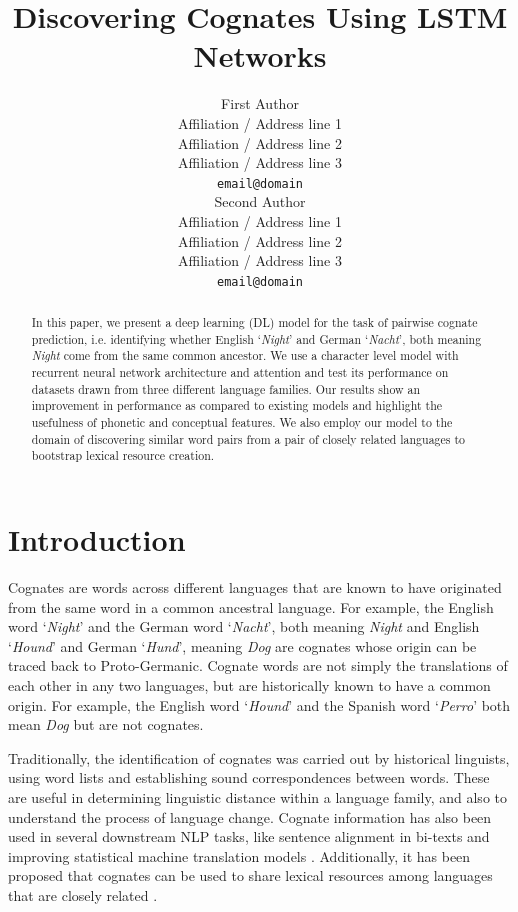 \documentclass[11pt,letterpaper]{article}
\title{Discovering Cognates Using LSTM Networks}
\author{First Author \\
  Affiliation / Address line 1 \\
   Affiliation / Address line 2 \\
   Affiliation / Address line 3 \\
   {\tt email@domain} \\\And
   Second Author \\
   Affiliation / Address line 1 \\
   Affiliation / Address line 2 \\
   Affiliation / Address line 3 \\
   {\tt email@domain} \\}
\date{}
\begin{document}
\maketitle

\begin{abstract}
In this paper, we present a deep learning (DL) model for the task of pairwise cognate prediction, i.e. identifying whether English `\textit{Night}' and German `\textit{Nacht}', both meaning \textit{Night} come from the same common ancestor. We use a character level model with recurrent neural network architecture and attention and test its performance on datasets drawn from three different language families. Our results show an improvement in performance as compared to existing models and highlight the usefulness of phonetic and conceptual features. We also employ our model to the domain of discovering similar word pairs from a pair of closely related languages to bootstrap lexical resource creation.
\end{abstract}

\section{Introduction}
Cognates are words across different languages that are known to have originated from the same word in a common ancestral language. For example, the English word  `\textit{Night}' and the German word `\textit{Nacht}', both meaning \textit{Night} and English `\textit{Hound}' and German `\textit{Hund}', meaning \textit{Dog} are cognates whose origin can be traced back to Proto-Germanic. Cognate words are not simply the translations of each other in any two languages, but are historically known to have a common origin. For example, the English word `\textit{Hound}' and the Spanish word `\textit{Perro}' both mean \textit{Dog} but are not cognates.

Traditionally, the identification of cognates was carried out by historical linguists, using word lists and establishing sound correspondences between words. These are useful in determining linguistic distance within a language family, and also to understand the process of language change. Cognate information has also been used in several downstream NLP tasks, like sentence alignment in bi-texts \cite{simard1993using} and improving statistical machine translation models \cite{kondrak2003cognates}. Additionally, it has been proposed that cognates can be used to share lexical resources among languages that are closely related \cite{Singh:07b}.
\end{document}
